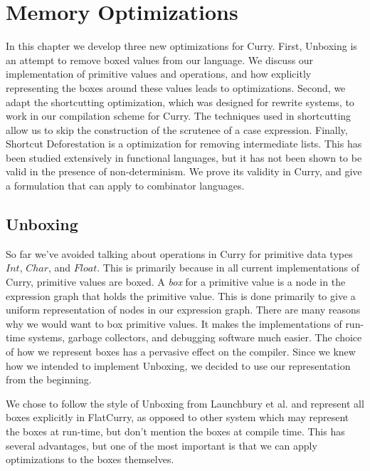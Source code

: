 \documentclass{book}
\theoremstyle{definition}
\newcommand{\Conid}[1]{\mathit{#1}}
\begin{document}
\chapter{Memory Optimizations} \label{ch:Memory Optimizations}


In this chapter we develop three new optimizations for Curry.
First, Unboxing is an attempt to remove boxed values from our language.
We discuss our implementation of primitive values and operations,
and how explicitly representing the boxes around these values leads to optimizations.
Second, we adapt the shortcutting optimization,
which was designed for rewrite systems,
to work in our compilation scheme for Curry.
The techniques used in shortcutting allow us to
skip the construction of the scrutenee of a case expression.
Finally, Shortcut Deforestation is a optimization for removing intermediate lists.
This has been studied extensively in functional languages,
but it has not been shown to be valid in the presence of non-determinism.
We prove its validity in Curry,
and give a formulation that can apply to combinator languages.

\section{Unboxing}

So far we've avoided talking about operations in Curry for 
primitive data types \ensuremath{\Conid{Int}}, \ensuremath{\Conid{Char}}, and \ensuremath{\Conid{Float}}.
This is primarily because in all current implementations of Curry,
primitive values are boxed.
A \emph{box} for a primitive value is a node in the expression graph
that holds the primitive value.
This is done primarily to give a uniform representation of nodes in our expression graph.
There are many reasons why we would want to box primitive values.
It makes the implementations of run-time systems, garbage collectors, and debugging software much easier.
The choice of how we represent boxes has a pervasive effect on the compiler.
Since we knew how we intended to implement Unboxing, 
we decided to use our representation from the beginning.

We chose to follow the style of Unboxing from Launchbury et al. \cite{unboxing}
and represent all boxes explicitly in FlatCurry,
as opposed to other system which may represent the boxes at run-time,
but don't mention the boxes at compile time.
This has several advantages, but one of the most important
is that we can apply optimizations to the boxes themselves.
\end{document}
